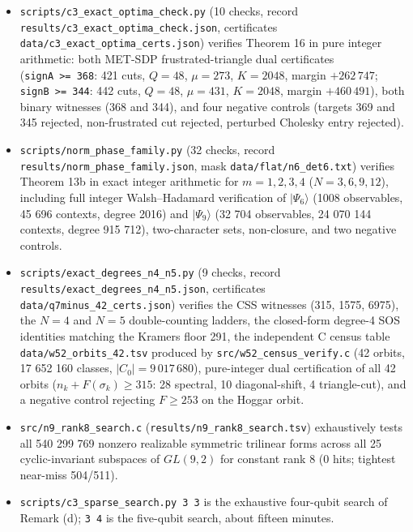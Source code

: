\documentclass[11pt,a4paper]{article}
\begin{document}
\begin{itemize}
  witnesses (368 and 344), and three negative controls (including failure of positive definiteness at
  threshold \(230/16\)).
\item
  \nolinkurl{scripts/c3_exact_optima_check.py} (10 checks, record \nolinkurl{results/c3_exact_optima_check.json}, certificates
  \nolinkurl{data/c3_exact_optima_certs.json}) verifies Theorem 16\textquotesingle\textquotesingle{} in pure integer arithmetic: both MET-SDP
  frustrated-triangle dual certificates (\texttt{signA\ \textgreater{}=\ 368}: 421 cuts, \(Q=48\), \(\mu=273\), \(K=2048\), margin
  \(+262\,747\); \texttt{signB\ \textgreater{}=\ 344}: 442 cuts, \(Q=48\), \(\mu=431\), \(K=2048\), margin \(+460\,491\)), both binary
  witnesses (368 and 344), and four negative controls (targets 369 and 345 rejected, non-frustrated cut
  rejected, perturbed Cholesky entry rejected).
\item
  \nolinkurl{scripts/norm_phase_family.py} (32 checks, record \nolinkurl{results/norm_phase_family.json}, mask
  \nolinkurl{data/flat/n6_det6.txt}) verifies Theorem 13b in exact integer arithmetic for \(m = 1, 2, 3, 4\)
  (\(N = 3, 6, 9, 12\)), including full integer Walsh--Hadamard verification of \(|\Psi_6\rangle\) (1008
  observables, 45 696 contexts, degree 2016) and \(|\Psi_9\rangle\) (32 704 observables, 24 070 144
  contexts, degree 915 712), two-character sets, non-closure, and two negative controls.
\item
  \nolinkurl{scripts/exact_degrees_n4_n5.py} (9 checks, record \nolinkurl{results/exact_degrees_n4_n5.json}, certificates
  \nolinkurl{data/q7minus_42_certs.json}) verifies the CSS witnesses (315, 1575, 6975), the \(N=4\) and \(N=5\)
  double-counting ladders, the closed-form degree-4 SOS identities matching the Kramers floor 291, the
  independent C census table \nolinkurl{data/w52_orbits_42.tsv} produced by \nolinkurl{src/w52_census_verify.c} (42 orbits,
  17 652 160 classes, \(|C_0|=9\,017\,680\)), pure-integer dual certification of all 42 orbits
  (\(n_k + F(\sigma_k) \ge 315\): 28 spectral, 10 diagonal-shift, 4 triangle-cut), and a negative control
  rejecting \(F \ge 253\) on the Hoggar orbit.
\item
  \nolinkurl{src/n9_rank8_search.c} (\nolinkurl{results/n9_rank8_search.tsv}) exhaustively tests all 540 299 769 nonzero
  realizable symmetric trilinear forms across all 25 cyclic-invariant subspaces of \(GL(9,2)\) for constant
  rank 8 (0 hits; tightest near-miss 504/511).
\item
  \texttt{scripts/c3\_sparse\_search.py\ 3\ 3} is the exhaustive four-qubit search of Remark (d); \texttt{3\ 4} is the
  five-qubit search, about fifteen minutes.
\end{itemize}
\end{document}
